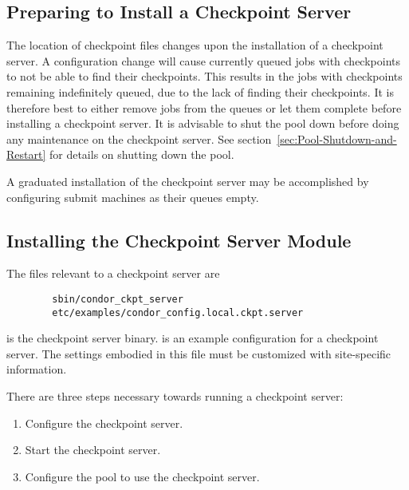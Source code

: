 \subsection{\label{Prepare-Ckpt-Server} Preparing to Install
a Checkpoint Server} 

The location of checkpoint files changes upon the installation
of a checkpoint server.
A configuration change will cause 
currently queued jobs with checkpoints
to not be able to find their checkpoints.
This results in the jobs with checkpoints
remaining indefinitely queued,
due to the lack of finding their checkpoints.
It is therefore best to 
either remove jobs from the queues or let them complete
before installing a checkpoint server.
It is advisable to shut the pool down before doing any
maintenance on the checkpoint server.  
See section~\ref{sec:Pool-Shutdown-and-Restart}
for details on shutting down the pool. 

A graduated installation of the checkpoint server may be
accomplished by 
configuring submit machines as their queues empty.

\subsection{\label{Install-Ckpt-Server-Module}
Installing the Checkpoint Server Module} 

The files relevant to a checkpoint server are
\begin{verbatim}
        sbin/condor_ckpt_server
        etc/examples/condor_config.local.ckpt.server
\end{verbatim}

 is the checkpoint server binary.
 is an example
configuration for a checkpoint server. The settings embodied in this
file must be customized with site-specific information.

There are three steps necessary towards running a checkpoint server:
\begin{enumerate}
\item Configure the checkpoint server.
\item Start the checkpoint server.
\item Configure the pool to use the checkpoint server.
\end{enumerate}


